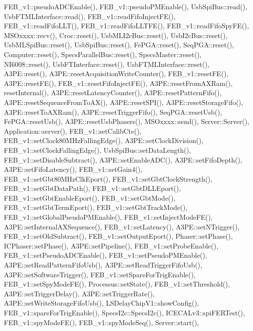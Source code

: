 F\+E\+B\+\_\+v1\+::pseudo\+A\+D\+C\+Enable(), F\+E\+B\+\_\+v1\+::pseudo\+P\+M\+Enable(), Usb\+Spi\+Bus\+::read(), Usb\+F\+T\+M\+L\+Interface\+::read(), F\+E\+B\+\_\+v1\+::read\+Fifo\+Inject\+F\+E(), F\+E\+B\+\_\+v1\+::read\+Fifo\+L\+L\+T(), F\+E\+B\+\_\+v1\+::read\+Fifo\+L\+L\+T\+F\+E(), F\+E\+B\+\_\+v1\+::read\+Fifo\+Spy\+F\+E(), M\+S\+Oxxxx\+::recv(), Croc\+::reset(), Usb\+M\+L\+I2c\+Bus\+::reset(), Usb\+I2c\+Bus\+::reset(), Usb\+M\+L\+Spi\+Bus\+::reset(), Usb\+Spi\+Bus\+::reset(), Fe\+P\+G\+A\+::reset(), Seq\+P\+G\+A\+::reset(), Computer\+::reset(), Specs\+Parallel\+Bus\+::reset(), Specs\+Master\+::reset(), N\+I6008\+::reset(), Usb\+F\+T\+Interface\+::reset(), Usb\+F\+T\+M\+L\+Interface\+::reset(), A3\+P\+E\+::reset(), A3\+P\+E\+::reset\+Acquisition\+Write\+Counter(), F\+E\+B\+\_\+v1\+::reset\+F\+E(), A3\+P\+E\+::reset\+F\+E(), F\+E\+B\+\_\+v1\+::reset\+Fifo\+Inject\+F\+E(), A3\+P\+E\+::reset\+From\+A\+X\+Ram(), reset\+Internal(), A3\+P\+E\+::reset\+Latency\+Counter(), A3\+P\+E\+::reset\+Pattern\+Fifo(), A3\+P\+E\+::reset\+Sequence\+From\+To\+A\+X(), A3\+P\+E\+::reset\+S\+P\+I(), A3\+P\+E\+::reset\+Storage\+Fifo(), A3\+P\+E\+::reset\+To\+A\+X\+Ram(), A3\+P\+E\+::reset\+Trigger\+Fifo(), Seq\+P\+G\+A\+::reset\+Usb(), Fe\+P\+G\+A\+::reset\+Usb(), A3\+P\+E\+::reset\+Usb\+Phasers(), M\+S\+Oxxxx\+::send(), Server\+::\+Server(), Application\+::server(), F\+E\+B\+\_\+v1\+::set\+Calib\+Cte(), F\+E\+B\+\_\+v1\+::set\+Clock80\+M\+Hz\+Falling\+Edge(), A3\+P\+E\+::set\+Clock\+Division(), F\+E\+B\+\_\+v1\+::set\+Clock\+Falling\+Edge(), Usb\+Spi\+Bus\+::set\+Data\+Length(), F\+E\+B\+\_\+v1\+::set\+Disable\+Subtract(), A3\+P\+E\+::set\+Enable\+A\+D\+C(), A3\+P\+E\+::set\+Fifo\+Depth(), A3\+P\+E\+::set\+Fifo\+Latency(), F\+E\+B\+\_\+v1\+::set\+Gain4(), F\+E\+B\+\_\+v1\+::set\+Gbt80\+M\+Hz\+Clk\+Eport(), F\+E\+B\+\_\+v1\+::set\+Gbt\+Clock\+Strength(), F\+E\+B\+\_\+v1\+::set\+Gbt\+Data\+Path(), F\+E\+B\+\_\+v1\+::set\+Gbt\+D\+L\+L\+Eport(), F\+E\+B\+\_\+v1\+::set\+Gbt\+Enable\+Eport(), F\+E\+B\+\_\+v1\+::set\+Gbt\+Mode(), F\+E\+B\+\_\+v1\+::set\+Gbt\+Term\+Eport(), F\+E\+B\+\_\+v1\+::set\+Gbt\+Track\+Mode(), F\+E\+B\+\_\+v1\+::set\+Global\+Pseudo\+P\+M\+Enable(), F\+E\+B\+\_\+v1\+::set\+Inject\+Mode\+F\+E(), A3\+P\+E\+::set\+Internal\+A\+X\+Sequence(), F\+E\+B\+\_\+v1\+::set\+Latency(), A3\+P\+E\+::set\+N\+Trigger(), F\+E\+B\+\_\+v1\+::set\+Old\+Subtract(), F\+E\+B\+\_\+v1\+::set\+Output\+Eport(), Phaser\+::set\+Phase(), I\+C\+Phaser\+::set\+Phase(), A3\+P\+E\+::set\+Pipeline(), F\+E\+B\+\_\+v1\+::set\+Probe\+Enable(), F\+E\+B\+\_\+v1\+::set\+Pseudo\+A\+D\+C\+Enable(), F\+E\+B\+\_\+v1\+::set\+Pseudo\+P\+M\+Enable(), A3\+P\+E\+::set\+Read\+Pattern\+Fifo\+Usb(), A3\+P\+E\+::set\+Read\+Trigger\+Fifo\+Usb(), A3\+P\+E\+::set\+Software\+Trigger(), F\+E\+B\+\_\+v1\+::set\+Spare\+For\+Trig\+Enable(), F\+E\+B\+\_\+v1\+::set\+Spy\+Mode\+F\+E(), Processus\+::set\+State(), F\+E\+B\+\_\+v1\+::set\+Threshold(), A3\+P\+E\+::set\+Trigger\+Delay(), A3\+P\+E\+::set\+Trigger\+Rate(), A3\+P\+E\+::set\+Write\+Storage\+Fifo\+Usb(), L\+S\+Delay\+Chip\+V1\+::show\+Config(), F\+E\+B\+\_\+v1\+::spare\+For\+Trig\+Enable(), Specs\+I2c\+::\+Specs\+I2c(), I\+C\+E\+C\+A\+Lv3\+::spi\+F\+E\+R\+Test(), F\+E\+B\+\_\+v1\+::spy\+Mode\+F\+E(), F\+E\+B\+\_\+v1\+::spy\+Mode\+Seq(), Server\+::start(), 